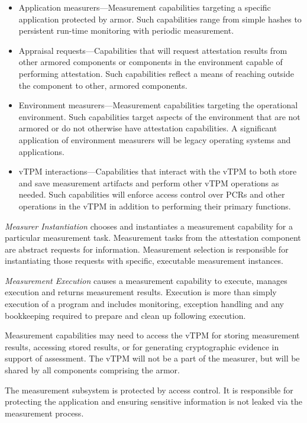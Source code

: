 \documentclass[10pt]{article}
\newcommand{\squash}{\parskip=0pt\itemsep=0pt}
\begin{document}
\begin{itemize}
  \squash
\item Application measurers---Measurement capabilities targeting a
  specific application protected by armor.  Such capabilities range
  from simple hashes to persistent run-time monitoring with periodic
  measurement.
\item Appraisal requests---Capabilities that will request attestation
  results from other armored components or components in the
  environment capable of performing attestation.  Such capabilities
  reflect a means of reaching outside the component to other,
  armored components.
\item Environment measurers---Measurement capabilities targeting
  the operational environment.  Such capabilities target aspects of
  the environment that are not armored or do not otherwise have
  attestation capabilities.  A significant application of environment
  measurers will be legacy operating systems and applications.
\item vTPM interactions---Capabilities that interact with the vTPM to
  both store and save measurement artifacts and perform other vTPM
  operations as needed.  Such capabilities will enforce
  access control over PCRs and other operations in the vTPM in
  addition to performing their primary functions.
\end{itemize}

\emph{Measurer Instantiation} chooses and instantiates a measurement
capability for a particular measurement task.  Measurement tasks from
the attestation component are abstract requests for information.
Measurement selection is responsible for instantiating those requests
with specific, executable measurement instances.

\emph{Measurement Execution} causes a measurement capability to execute,
manages execution and returns measurement results.  Execution is more
than simply execution of a program and includes monitoring, exception
handling and any bookkeeping required to prepare and clean up
following execution.

Measurement capabilities may need to access the vTPM for storing
measurement results, accessing stored results, or for generating
cryptographic evidence in support of assessment.  The vTPM will not be
a part of the measurer, but will be shared by all components
comprising the armor.

The measurement subsystem is protected by access control.  It
is responsible for protecting the application and ensuring sensitive
information is not leaked via the measurement process.
\end{document}
